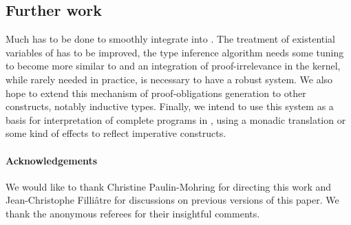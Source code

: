 \documentclass{llncs}
\begin{document}
\subsection{Further work}
Much has to be done to smoothly integrate \Russell into \Coq. The
treatment of existential variables of \Coq has to be improved, the
type inference algorithm needs some tuning to become more similar to \ML
and an integration of proof-irrelevance in the kernel, while rarely needed in
practice, is necessary to have a robust system.
We also hope to extend this mechanism of proof-obligations generation to other
constructs, notably inductive types. Finally, we intend to use this system as a
basis for interpretation of complete \ML{} programs in \Coq, using a monadic
translation or some kind of effects to reflect imperative constructs.

\paragraph{Acknowledgements}
We would like to thank Christine Paulin-Mohring for directing this work and
Jean-Christophe Filli\^atre for discussions on previous versions of this
paper. We thank the anonymous referees for their insightful comments.


\end{document}
